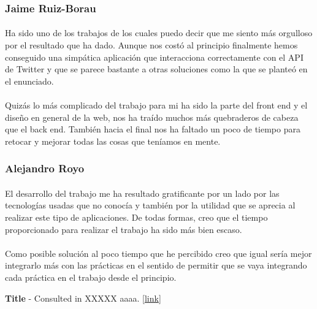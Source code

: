 \documentclass[a4paper]{article}
\begin{document}
		\subsubsection{Jaime Ruiz-Borau}
			
			\paragraph{} Ha sido uno de los trabajos de los cuales puedo decir que me siento más orgulloso por el resultado que ha dado. Aunque nos costó al principio finalmente hemos conseguido una simpática aplicación que interacciona correctamente con el API de Twitter y que se parece bastante a otras soluciones como la que se planteó en el enunciado.
			
			\paragraph{}Quizás lo más complicado del trabajo para mi ha sido la parte del front end y el diseño en general de la web, nos ha traído muchos más quebraderos de cabeza que el back end. También hacia el final nos ha faltado un poco de tiempo para retocar y mejorar todas las cosas que teníamos en mente.
		
		\subsubsection{Alejandro Royo}
		
			\paragraph{} El desarrollo del trabajo me ha resultado gratificante por un lado por las tecnologías usadas que no conocía y también por la utilidad que se aprecia al realizar este tipo de aplicaciones. De todas formas, creo que el tiempo proporcionado para realizar el trabajo ha sido más bien escaso.
			
			\paragraph{} Como posible solución al poco tiempo que he percibido creo que igual sería mejor integrarlo más con las prácticas en el sentido de permitir que se vaya integrando cada práctica en el trabajo desde el principio.
	
\newpage
\begin{thebibliography}{99} 
 \textbf{Title} - Consulted in XXXXX aaaa. [\url{link}]

\end{thebibliography}
\end{document}
